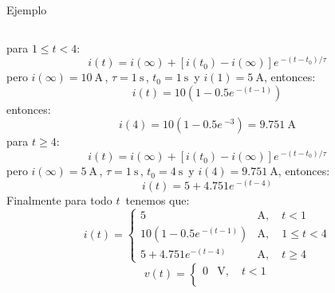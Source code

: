 \documentclass[aspectratio=169]{beamer}
\begin{document}
\begin{frame}{Ejemplo}
\begin{columns}[onlytextwidth]
\begin{column}{0.5\textwidth}
{{            }
        }
            {
            {para $1\leq t < 4$:
            \begin{equation*}
                i(t)= i(\infty) + [i(t_0)-i(\infty)]e\,^{-(t - t_0)/ \tau}          
            \end{equation*}
            }
            {pero $i(\infty) = \SI{10}{\ampere}\,$, $\tau=\SI{1}{\second}\,$, $t_0 = \SI{1}{\second}\,$ y $i(1)=\SI{5}{\ampere}$, entonces: 
            \begin{equation*}
                i(t)=10\left(1-0.5e\,^{-(t - 1)}\right)         
            \end{equation*}
            }
            {entonces: 
            \begin{equation*}
                i(4)=10\left(1-0.5e\,^{-3}\right)=\SI{9.751}{\ampere}      
            \end{equation*}
            }
        }
            {
            {para $t \geq 4$:
            \begin{equation*}
                i(t)= i(\infty) + [i(t_0)-i(\infty)]e\,^{-(t - t_0)/ \tau}          
            \end{equation*}
            }
            {pero $i(\infty) = \SI{5}{\ampere}\,$, $\tau=\SI{1}{\second}\,$, $t_0 = \SI{4}{\second}\,$ y $i(4)=\SI{9.751}{\ampere}$, entonces: 
            \begin{equation*}
                i(t)=5+4.751e\,^{-(t - 4)}        
            \end{equation*}
            }
        }
            {
            {Finalmente para todo $t\,$ tenemos que:
            \begin{equation*}
                i(t) =
                \begin{cases}
                    5 &\si{\ampere},\quad t < 1\\
                    10\left(1-0.5e\,^{-(t-1)}\right) &\si{\ampere},\quad 1 \leq t < 4\\
                    5+4.751e^{-(t-4)} &\si{\ampere},\quad t \geq 4
                \end{cases}
            \end{equation*}
            }
            {\begin{equation*}
                v(t) =
                \begin{cases}
                    0 &\si{\volt},\quad t < 1\\

\end{cases}
\end{equation*}}}
\end{column}
\end{columns}
\end{frame}
\end{document}
